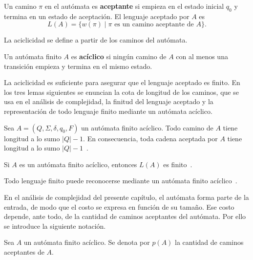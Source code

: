 \begin{definicion}
Un camino $\pi$ en el autómata es \textbf{aceptante} si empieza en el
estado inicial $q_0$ y termina en un estado de aceptación. El lenguaje
aceptado por $A$ es
\[
  L(A) =
  \{w(\pi) \mid \pi
  \text{ es un camino aceptante de } A\}.
\]
\end{definicion}

La aciclicidad se define a partir de los caminos del autómata.

\begin{definicion}
Un autómata finito $A$ es \textbf{acíclico} si
ningún camino de $A$ con al menos una transición empieza y termina en
el mismo estado.
\end{definicion}

La aciclicidad es suficiente para asegurar que el lenguaje aceptado es
finito. En los tres lemas siguientes se enuncian la cota de longitud de
los caminos, que se usa en el análisis de complejidad, la finitud del
lenguaje aceptado y la representación de todo lenguaje finito mediante
un autómata acíclico.

\begin{lema}
\label{lema:longitud-caminos-aciclicos}
Sea $A=(Q,\Sigma,\delta,q_0,F)$ un autómata finito acíclico. Todo
camino de $A$ tiene longitud a lo sumo $|Q|-1$. En
consecuencia, toda cadena aceptada por $A$ tiene longitud a lo sumo
$|Q|-1$~\cite{bertsch2001rcg}.
\end{lema}

\begin{lema}
\label{lema:lenguaje-finito-aciclico}
Si $A$ es un autómata finito acíclico, entonces
$L(A)$ es finito~\cite{bertsch2001rcg}.
\end{lema}

\begin{lema}
\label{lema:finito-reconocible-aciclico}
Todo lenguaje finito puede reconocerse mediante un autómata finito
acíclico~\cite{bertsch2001rcg}.
\end{lema}

En el análisis de complejidad del presente capítulo, el autómata forma
parte de la entrada, de modo que el costo se expresa en función de su
tamaño. Ese costo depende, ante todo, de la cantidad de caminos
aceptantes del autómata. Por ello se introduce la siguiente notación.

\begin{definicion}
Sea $A$ un autómata finito acíclico. Se denota por $p(A)$ la cantidad
de caminos aceptantes de $A$.
\end{definicion}

